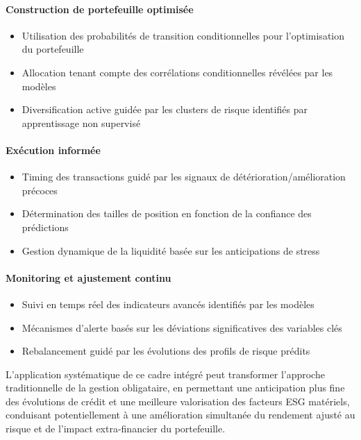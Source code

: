 \paragraph{Construction de portefeuille optimisée}
\begin{itemize}
  \item Utilisation des probabilités de transition conditionnelles pour l'optimisation du portefeuille
  \item Allocation tenant compte des corrélations conditionnelles révélées par les modèles
  \item Diversification active guidée par les clusters de risque identifiés par apprentissage non supervisé
\end{itemize}

\paragraph{Exécution informée}
\begin{itemize}
  \item Timing des transactions guidé par les signaux de détérioration/amélioration précoces
  \item Détermination des tailles de position en fonction de la confiance des prédictions
  \item Gestion dynamique de la liquidité basée sur les anticipations de stress
\end{itemize}

\paragraph{Monitoring et ajustement continu}
\begin{itemize}
  \item Suivi en temps réel des indicateurs avancés identifiés par les modèles
  \item Mécanismes d'alerte basés sur les déviations significatives des variables clés
  \item Rebalancement guidé par les évolutions des profils de risque prédits
\end{itemize}

L'application systématique de ce cadre intégré peut transformer l'approche traditionnelle de la gestion obligataire, en permettant une anticipation plus fine des évolutions de crédit et une meilleure valorisation des facteurs ESG matériels, conduisant potentiellement à une amélioration simultanée du rendement ajusté au risque et de l'impact extra-financier du portefeuille.
